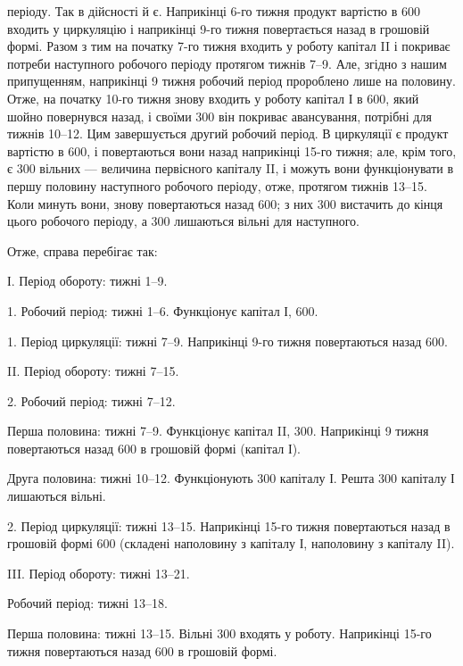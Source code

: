 \parcont{}  %
періоду. Так в дійсності й є. Наприкінці 6-го тижня продукт вартістю
в 600 входить у циркуляцію і наприкінці 9-го тижня повертається
назад в грошовій формі. Разом з тим на початку 7-го тижня
входить у роботу капітал II і покриває потреби наступного робочого
періоду протягом тижнів 7--9. Але, згідно з нашим припущенням, наприкінці
9 тижня робочий період пророблено лише на половину. Отже, на
початку 10-го тижня знову входить у роботу капітал І в 600,
який шойно повернувся назад, і своїми 300 він покриває авансування,
потрібні для тижнів 10--12. Цим завершується другий робочий
період. В циркуляції є продукт вартістю в 600, і повертаються
вони назад наприкінці 15-го тижня; але, крім того, є 300
вільних — величина первісного капіталу II, і можуть вони функціонувати
в першу половину наступного робочого періоду, отже, протягом тижнів
13--15. Коли минуть вони, знову повертаються назад 600;
з них 300 вистачить до кінця цього робочого періоду, а
300 лишаються вільні для наступного.

Отже, справа перебігає так:

І. Період обороту: тижні 1--9.

1. Робочий період: тижні 1--6. Функціонує капітал І, 600.

1. Період циркуляції: тижні 7--9. Наприкінці 9-го тижня повертаються
назад 600.

II. Період обороту: тижні 7--15.

2. Робочий період: тижні 7--12.

Перша половина: тижні 7--9. Функціонує капітал II, 300.
Наприкінці 9 тижня повертаються назад 600 в грошовій формі
(капітал І).

Друга половина: тижні 10--12. Функціонують 300 капіталу
І. Решта 300 капіталу І лишаються вільні.

2. Період циркуляції: тижні 13--15. Наприкінці 15-го тижня повертаються
назад в грошовій формі 600 (складені наполовину
з капіталу І, наполовину з капіталу II).

III. Період обороту: тижні 13--21.

Робочий період: тижні 13--18.

Перша половина: тижні 13--15. Вільні 300 входять у
роботу. Наприкінці 15-го тижня повертаються назад 600 в грошовій
формі.

